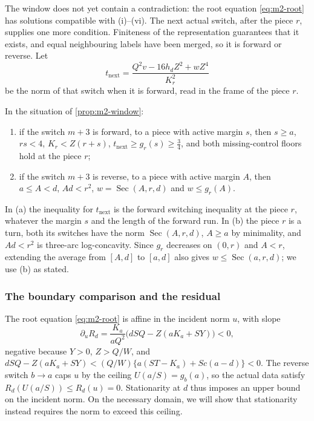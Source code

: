 The window does not yet contain a contradiction: the root equation \eqref{eq:m2-root} has solutions
compatible with (i)--(vi). The next actual switch, after the piece $r$, supplies one more condition.
Finiteness of the representation guarantees that it exists, and equal neighbouring labels have
been merged, so it is forward or reverse. Let
\[
t_{\mathrm{next}}=\frac{Q^2v-16h_dZ^2+wZ^4}{K_r^2}
\]
be the norm of that switch when it is forward, read in the frame of the piece $r$.

\begin{proposition}\label{prop:m2-continuation}
In the situation of \cref{prop:m2-window}:
\begin{enumerate}[label=(\alph*)]
\item if the switch $m+3$ is forward, to a piece with active margin $s$, then $s\ge a$, $rs<4$,
$K_r<Z(r+s)$, $t_{\mathrm{next}}\ge g_r(s)\ge\frac34$, and both missing-control floors hold at the
piece $r$;
\item if the switch $m+3$ is reverse, to a piece with active margin $A$, then $a\le A<d$, $Ad<r^2$,
$w=\operatorname{Sec}(A,r,d)$ and $w\le g_r(A)$.
\end{enumerate}
\end{proposition}

In (a) the inequality for $t_{\mathrm{next}}$ is the forward switching inequality at the piece $r$,
whatever the margin $s$ and the length of the forward run. In (b) the piece $r$ is a turn, both its
switches have the norm $\operatorname{Sec}(A,r,d)$, $A\ge a$ by minimality, and $Ad<r^2$ is
three-arc log-concavity. Since $g_r$ decreases on $(0,r)$ and $A<r$, extending the average from
$[A,d]$ to $[a,d]$ also gives $w\le\operatorname{Sec}(a,r,d)$; we use (b) as stated.

\subsubsection{The boundary comparison and the residual}\label{sec:m2-comparison}

The root equation \eqref{eq:m2-root} is affine in the incident norm $u$, with slope
\begin{equation}\label{eq:m2-Ru}
\partial_uR_d=\frac{K_a}{aQ^2}\bigl(dSQ-Z(aK_a+SY)\bigr)<0,
\end{equation}
negative because $Y>0$, $Z>Q/W$, and $dSQ-Z(aK_a+SY)<(Q/W)\{a(ST-K_a)+Sc(a-d)\}<0$. The reverse
switch $b\to a$ caps $u$ by the ceiling $U(a/S)=g_b(a)$, so the actual data satisfy
$R_d(U(a/S))\le R_d(u)=0$. Stationarity at $d$ thus imposes an upper bound on the incident norm. On the necessary domain,
we will show that stationarity instead requires the norm to exceed this ceiling.

